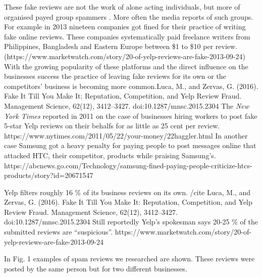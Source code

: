 \documentclass[conference]{IEEEtran}  %
\theoremstyle{plain}
\theoremstyle{definition}
\theoremstyle{remark}
\begin{document}
These fake reviews are not the work of alone acting individuals, but more of organised payed group spammers \cite{choo2015detecting}. More often the media reports of such groups. For example in 2013 nineteen companies got fined for their practice of writing fake online reviews. These companies systematically paid freelance writers from Philippines, Bangladesh and Eastern Europe between \$1 to \$10 per review. (https://www.marketwatch.com/story/20-of-yelp-reviews-are-fake-2013-09-24)
With the growing popularity of these platforms and the direct influence on the businesses success the practice of leaving fake reviews for its own or the competitors’ business is becoming more common.Luca, M., and Zervas, G. (2016). Fake It Till You Make It: Reputation, Competition, and Yelp Review Fraud. Management Science, 62(12), 3412–3427. doi:10.1287/mnsc.2015.2304 
The \textit{New York Times} reported in 2011 on the case of businesses hiring workers to post fake 5-star Yelp reviews on their behalfs for as little as 25 cent per review. https://www.nytimes.com/2011/05/22/your-money/22haggler.html
In another case Samsung got a heavy penalty for paying people to post messages online that attacked HTC, their competitor, products while praising Samsung’s. https://abcnews.go.com/Technology/samsung-fined-paying-people-criticize-htcs-products/story?id=20671547

Yelp filters roughly 16 \% of its business reviews on its own. /cite Luca, M., and Zervas, G. (2016). Fake It Till You Make It: Reputation, Competition, and Yelp Review Fraud. Management Science, 62(12), 3412–3427. doi:10.1287/mnsc.2015.2304 
Still reportedly Yelp’s spokesman says 20-25 \% of the submitted reviews are “suspicious”. https://www.marketwatch.com/story/20-of-yelp-reviews-are-fake-2013-09-24

In Fig. 1 examples of spam reviews we researched are shown. These reviews were posted by the same person but for two different businesses. 
\end{document}
